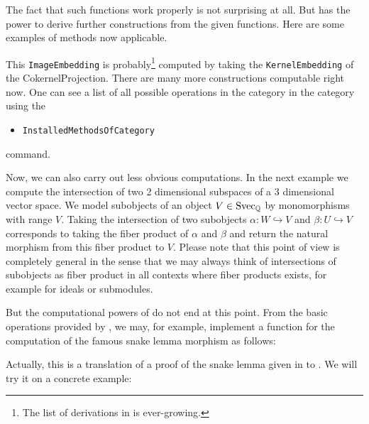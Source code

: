 \begin{small}

\end{small}

The fact that such functions work properly is not surprising at all. But \CapPkg has the power to derive
further constructions from the given functions. Here are some examples of methods now applicable.

\begin{small}

\end{small}

This \texttt{ImageEmbedding} is probably\footnote{The list of derivations in \CapPkg is ever-growing.} computed by taking the \texttt{KernelEmbedding} of the \textrm{CokernelProjection}.
There are many more constructions computable right now. One can see a list of all possible operations in the category
in the category using the 
\begin{itemize}
  \item \texttt{InstalledMethodsOfCategory}
\end{itemize}
command.

\begin{small}

\end{small}

Now, we can also carry out less obvious computations. In the next example we compute the intersection of two 2 dimensional
subspaces of a 3 dimensional vector space.
We model subobjects of an object $V \in \mathrm{Svec}_{\mathbb{Q}}$ by monomorphisms with range $V$.
Taking the intersection of two subobjects 
$\alpha: W \hookrightarrow V$ and $\beta: U \hookrightarrow V$
corresponds to taking the fiber product of $\alpha$ and $\beta$ and return the natural morphism from this fiber product to $V$.
Please note that this point of view is completely general in the sense that we may always think of intersections of
subobjects as fiber product in all contexts where fiber products exists, for example for ideals or submodules.

\begin{small}

\end{small}

But the computational powers of \CapPkg do not end at this point.
From the basic operations provided by \CapPkg, we may, for example,
implement a function for the computation of the famous snake lemma morphism as follows:
\begin{small}
  
\end{small}
Actually, this is a translation of a proof of the snake lemma given in \cite{MLCWM} to \CapPkg.
We will try it on a concrete example:

